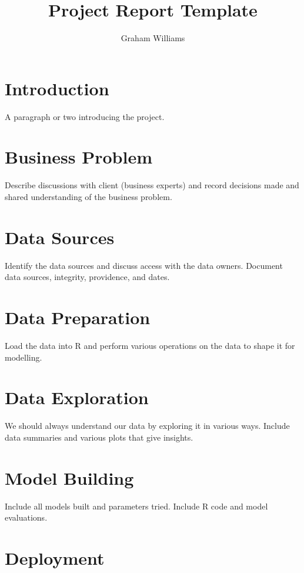 \documentclass[a4paper]{article}\usepackage[]{graphicx}\usepackage[]{color}
\begin{document}
\title{Project Report Template}
\author{Graham Williams}
\maketitle\thispagestyle{empty}

\section{Introduction}

A paragraph or two introducing the project.

\section{Business Problem}

Describe discussions with client (business experts) and record
decisions made and shared understanding of the business problem.

\section{Data Sources}

Identify the data sources and discuss access with the data
owners. Document data sources, integrity, providence, and dates.

\section{Data Preparation}

Load the data into R and perform various operations on the data to
shape it for modelling.

\section{Data Exploration}

We should always understand our data by exploring it in various
ways. Include data summaries and various plots that give insights.

\section{Model Building}

Include all models built and parameters tried. Include R code and
model evaluations.

\section{Deployment}
\end{document}
